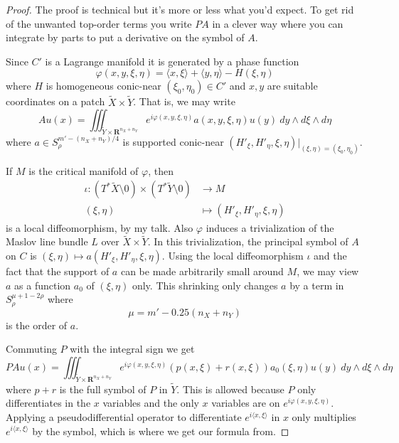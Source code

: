 \documentclass[reqno,12pt,letterpaper]{amsart}
\newcommand{\RR}{\mathbf{R}}
\theoremstyle{definition}
\begin{document}
\begin{proof}
The proof is technical but it's more or less what you'd expect.
To get rid of the unwanted top-order terms you write $PA$ in a clever way where you can integrate by parts to put a derivative on the symbol of $A$.

Since $C'$ is a Lagrange manifold it is generated by a phase function
$$\varphi(x, y, \xi, \eta) = \langle x, \xi\rangle + \langle y, \eta\rangle - H(\xi, \eta)$$
where $H$ is homogeneous conic-near $(\xi_0, \eta_0) \in C'$ and $x,y$ are suitable coordinates on a patch $\tilde X \times \tilde Y$.
That is, we may write
$$Au(x) = \iiint_{\tilde Y \times \RR^{n_X + n_Y}} e^{i\varphi(x, y, \xi, \eta)} a(x, y, \xi, \eta) u(y) ~dy \wedge d\xi \wedge d\eta$$
where $a \in S^{m' - (n_X + n_Y)/4}_\rho$ is supported conic-near $(H'_\xi, H'_\eta, \xi, \eta)|_{(\xi, \eta) = (\xi_0, \eta_0)}$.

If $M$ is the critical manifold of $\varphi$, then
\begin{align*}
\iota: (T^* \tilde X \setminus 0) \times (T^* \tilde Y \setminus 0) &\to M\\
(\xi, \eta) &\mapsto (H'_\xi, H'_\eta, \xi, \eta)
\end{align*}
is a local diffeomorphism, by my talk.
Also $\varphi$ induces a trivialization of the Maslov line bundle $L$ over $\tilde X \times \tilde Y$.
In this trivialization, the principal symbol of $A$ on $C$ is $(\xi, \eta) \mapsto a(H'_\xi, H'_\eta, \xi, \eta)$.
Using the local diffeomorphism $\iota$ and the fact that the support of $a$ can be made arbitrarily small around $M$, we may view $a$ as a function $a_0$ of $(\xi, \eta)$ only.
This shrinking only changes $a$ by a term in $S^{\mu + 1 - 2\rho}_\rho$ where
$$\mu = m' - 0.25(n_X + n_Y)$$
is the order of $a$.

Commuting $P$ with the integral sign we get
$$PAu(x) = \iiint_{\tilde Y \times \RR^{n_X + n_Y}} e^{i\varphi(x, y, \xi, \eta)}(p(x, \xi) + r(x, \xi)) a_0(\xi, \eta) u(y) ~dy \wedge d\xi \wedge d\eta$$
where $p + r$ is the full symbol of $P$ in $\tilde Y$. This is allowed because $P$ only differentiates in the $x$ variables and the only $x$ variables are on $e^{i\varphi(x, y, \xi, \eta)}$.
Applying a pseudodifferential operator to differentiate $e^{i\langle x, \xi\rangle}$ in $x$ only multiplies $e^{i\langle x, \xi\rangle}$ by the symbol, which is where we get our formula from.


\end{proof}
\end{document}
